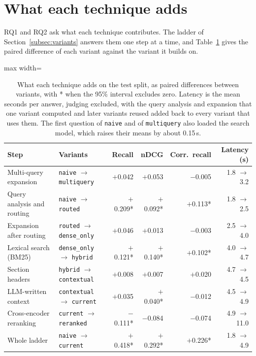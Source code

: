 \section{What each technique adds} \label{sec:results-ladder}

RQ1 and RQ2 ask what each technique contributes. The ladder of
Section~\ref{subsec:variants} answers them one step at a time, and
Table~\ref{tab:results-ladder} gives the paired difference of each variant
against the variant it builds on.

\begin{table}[htbp]
    \centering
    \footnotesize
    \begin{adjustbox}{max width=\textwidth}
    \begin{tabular}{|l|l|r|r|r|r|}
        \hline
        \textbf{Step} & \textbf{Variants} & \textbf{Recall} & \textbf{nDCG} & \textbf{Corr.\ recall} & \textbf{Latency (s)} \\
        \hline
        Multi-query expansion & \texttt{naive} $\rightarrow$ \texttt{multiquery} & $+$0.042 & $+$0.053 & $-$0.005 & 1.8 $\rightarrow$ 3.2 \\
        Query analysis and routing & \texttt{naive} $\rightarrow$ \texttt{routed} & $+$0.209* & $+$0.092* & $+$0.113* & 1.8 $\rightarrow$ 2.5 \\
        Expansion after routing & \texttt{routed} $\rightarrow$ \texttt{dense\_only} & $+$0.046 & $+$0.013 & $-$0.003 & 2.5 $\rightarrow$ 4.0 \\
        Lexical search (BM25) & \texttt{dense\_only} $\rightarrow$ \texttt{hybrid} & $+$0.121* & $+$0.140* & $+$0.102* & 4.0 $\rightarrow$ 4.7 \\
        Section headers & \texttt{hybrid} $\rightarrow$ \texttt{contextual} & $+$0.008 & $+$0.007 & $+$0.020 & 4.7 $\rightarrow$ 4.5 \\
        LLM-written context & \texttt{contextual} $\rightarrow$ \texttt{current} & $+$0.035 & $+$0.040* & $-$0.012 & 4.5 $\rightarrow$ 4.9 \\
        \hline
        Cross-encoder reranking & \texttt{current} $\rightarrow$ \texttt{reranked} & $-$0.111* & $-$0.084 & $-$0.074 & 4.9 $\rightarrow$ 11.0 \\
        \hline
        Whole ladder & \texttt{naive} $\rightarrow$ \texttt{current} & $+$0.418* & $+$0.292* & $+$0.226* & 1.8 $\rightarrow$ 4.9 \\
        \hline
    \end{tabular}
    \end{adjustbox}
    \caption[What each technique adds]{What each technique adds on the test
    split, as paired differences between variants, with * when the 95\% interval
    excludes zero. Latency is the mean seconds per answer, judging excluded,
    with the query analysis and expansion that one variant computed and later variants
    reused added back to every variant that uses them. The first question of
    \texttt{naive} and of \texttt{multiquery} also loaded the search model,
    which raises their means by about 0.15\,s.}
    \label{tab:results-ladder}
\end{table}

